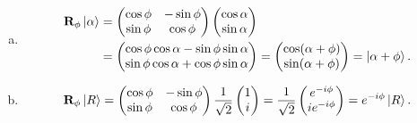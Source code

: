 \documentclass{book}
\theoremstyle{definition}
\newcommand{\nn}{\nonumber}
\newcommand{\al}{\alpha}
\newcommand{\f}[2]{\frac{#1}{#2}}
\begin{document}
\begin{enumerate}[(a)]
	
	\item 
	\begin{align}
	\mathbf{R}_\phi\ket{\al} &=  \begin{pmatrix}
	\cos\phi & -\sin\phi \\ \sin\phi & \cos\phi
	\end{pmatrix}\begin{pmatrix}
	\cos\al \\ \sin\al
	\end{pmatrix}\nn\\
	&= \begin{pmatrix}
	\cos\phi \cos\al - \sin\phi\sin\al \\
	\sin\phi \cos\al + \cos\phi \sin\al
	\end{pmatrix} = \begin{pmatrix}
	\cos(\al+\phi)\\\sin(\al+\phi)
	\end{pmatrix} = \ket{\al + \phi}.
	\end{align}
	
	
	\item 
	\begin{align}
	\mathbf{R}_\phi \ket{R} = \begin{pmatrix}
	\cos\phi & -\sin\phi \\ \sin\phi & \cos\phi
	\end{pmatrix}\f{1}{\sqrt{2}}\begin{pmatrix}
	1\\i
	\end{pmatrix} = \f{1}{\sqrt{2}}\begin{pmatrix}
	e^{-i\phi}\\ie^{-i\phi}
	\end{pmatrix} = e^{-i\phi}\ket{R}.
	\end{align}
	

\end{enumerate}
\end{document}
